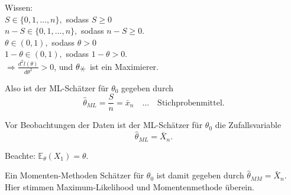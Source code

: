\documentclass{tstextbook}
\newcommand{\E}{\mathbb E}
\begin{document}
\begin{example}
	Wissen: \\
	
	$ S\in\lbrace0,1,\ldots,n\rbrace, $ sodass $ S \ge 0 $ \\
	
	$ n-S\in\lbrace0,1,\ldots,n\rbrace, $ sodass $ n-S \ge 0 $.\\
	
	$ \theta\in(0,1), $ sodass $ \theta > 0 $ \\
	
	$ 1-\theta\in(0,1), $ sodass $ 1-\theta > 0 $. \\
	
	$ \Rightarrow \frac{d^2l(\theta)}{d\theta^2} > 0 $, und $ \theta_{\hexstar} $ ist ein Maximierer.
	
	Also ist der ML-Schätzer für $ \theta_0 $ gegeben durch 
	\[
	\hat{\theta}_{ML} = \frac{S}{n} = \bar{x}_n \quad \ldots \quad \text{Stichprobenmittel}.
	\]
	
	Vor Beobachtungen der Daten ist der ML-Schätzer für $ \theta_0 $ die Zufallsvariable 
	\[
	\hat{\theta}_{ML} = \bar{X}_n.
	\]
	
	Beachte: $ \E_{\theta}(X_1)=\theta $. 
	
	Ein Momenten-Methoden Schätzer für $ \theta_0 $ ist damit gegeben durch $ \hat{\theta}_{MM} = \bar{X}_n $. Hier stimmen Maximum-Likelihood und Momentenmethode überein.
\end{example}



\printindex
\end{document}
